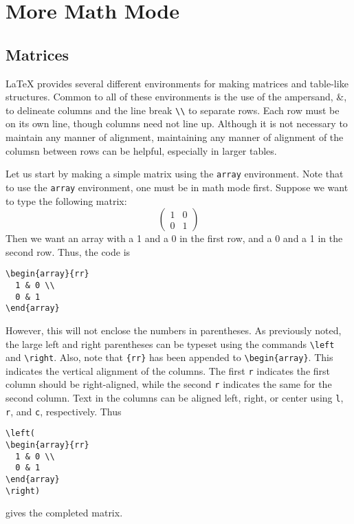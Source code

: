 \chapter{More Math Mode}
\label{cha:more-math-mode}

\section{Matrices}
\label{sec:matrices}

\LaTeX{} provides several different environments for making matrices
and table-like structures.  Common to all of these environments is the
use of the ampersand, \&, to delineate columns and the line break
\verb_\\_ to separate rows.  Each row must be on its own line, though
columns need not line up.  Although it is not necessary to maintain
any manner of alignment, maintaining any manner of alignment of the
columsn between rows can be helpful, especially in larger tables.

Let us start by making a simple matrix using the \verb_array_
environment.  Note that to use the \verb_array_ environment, one must
be in math mode first.  Suppose we want to type the following matrix:
\[
\left(\begin{array}{rr}
    1 & 0 \\
    0 & 1
  \end{array} \right)
\]
Then we want an array with a 1 and a 0 in the first row, and a 0 and a
1 in the second row.  Thus, the code is
\begin{verbatim}
\begin{array}{rr}
  1 & 0 \\
  0 & 1
\end{array}
\end{verbatim}
However, this will not enclose the numbers in parentheses.  As
previously noted, the large left and right parentheses can be typeset
using the commands \verb_\left_ and \verb_\right_.  Also, note that
\verb_{rr}_ has been appended to \verb_\begin{array}_.  This indicates
the vertical alignment of the columns.  The first \texttt{r}
indicates the first column should be right-aligned, while the second
\texttt{r} indicates the same for the second column.  Text in the
columns can be aligned left, right, or center using \texttt{l},
\texttt{r}, and \texttt{c}, respectively.  Thus
\begin{verbatim}
\left(
\begin{array}{rr}
  1 & 0 \\
  0 & 1
\end{array}
\right)
\end{verbatim}
gives the completed matrix.

